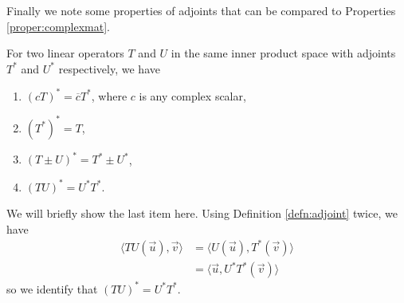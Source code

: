 Finally we note some properties of adjoints that can be compared to Properties \ref{proper:complexmat}.
\begin{proper}
For two linear operators $T$ and $U$ in the same inner product space with adjoints $T^*$ and $U^*$ respectively, we have
\begin{enumerate}
\item $(cT)^* = \overline{c}T^*$, where $c$ is any complex scalar,
\item $(T^*)^* = T$,
\item $(T \pm U)^* = T^* \pm U^*$,
\item $(TU)^* = U^*T^*$.
\end{enumerate}
\end{proper}
We will briefly show the last item here. Using Definition \ref{defn:adjoint} twice, we have
\begin{align*}
\langle TU(\vec{u}), \vec{v} \rangle &= \langle U(\vec{u}), T^*(\vec{v}) \rangle \\
&= \langle \vec{u}, U^*T^*(\vec{v}) \rangle
\end{align*}
so we identify that $(TU)^* = U^*T^*$.

